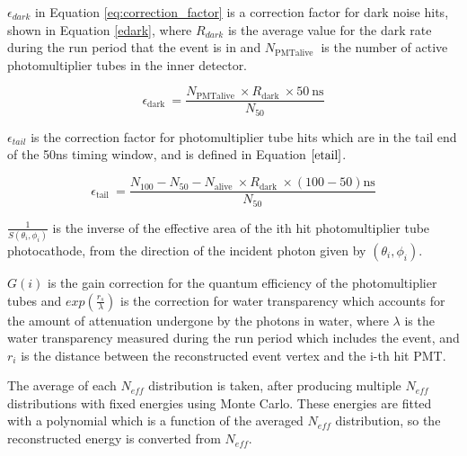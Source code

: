 $\epsilon_{dark}$ in Equation \ref{eq:correction_factor} is a correction factor for dark noise hits, shown in Equation \ref{edark}, where $R_{dark}$ is the average value for the dark rate during the run period that the event is in and $N_{\text {PMT}\text {alive }}$ is the number of active photomultiplier tubes in the inner detector.


\begin{equation}
    \epsilon_{\text {dark }}=\frac{N_{\text {PMT}\text {alive }} \times R_{\text {dark }} \times 50 \mathrm{~ns}}{N_{50}}
    \label{edark}
\end{equation}

$\epsilon_{tail}$ is the correction factor for photomultiplier tube hits which are in the tail end of the 50ns timing window, and is defined in Equation $\ref{etail}$.

\begin{equation}
    \epsilon_{\text {tail }}=\frac{N_{100}-N_{50}-N_{\text {alive }} \times R_{\text {dark }} \times(100-50) \mathrm{ns}}{N_{50}}
    \label{etail}
\end{equation}


$\frac{1}{S(\theta_{i}, \phi_{i})}$ is the inverse of the effective area of the ith hit photomultiplier tube photocathode, from the direction of the incident photon given by $(\theta_{i}, \phi_{i})$.

$G(i)$ is the gain correction for the quantum efficiency of the photomultiplier tubes and $exp(\frac{r_{s}}{\lambda})$ is the correction for water transparency which accounts for the amount of attenuation undergone by the photons in water, where $\lambda$ is the water transparency measured during the run period which includes the event, and $r_{i}$ is the distance between the reconstructed event vertex and the i-th hit PMT.

The average of each $N_{eff}$ distribution is taken, after producing multiple $N_{eff}$ distributions with fixed energies using Monte Carlo. These energies are fitted with a polynomial which is a function of the averaged $N_{eff}$ distribution, so the reconstructed energy is converted from $N_{eff}$.